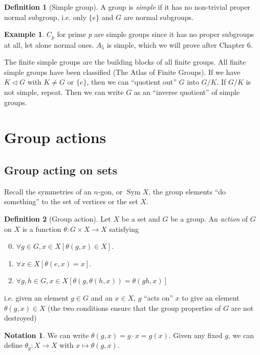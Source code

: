 \documentclass[a4paper]{article}
\theoremstyle{definition}
\newtheorem*{defi}{Definition}
\newtheorem*{eg}{Example}
\newtheorem*{notation}{Notation}
\let\stdsection\section
\renewcommand\section{\newpage\stdsection}
\DeclareMathOperator\Sym{Sym}
\begin{document}
\begin{defi}[Simple group]
  A group is \emph{simple} if it has no non-trivial proper normal subgroup, i.e. only $\{e\}$ and $G$ are normal subgroups.
\end{defi}

\begin{eg}
  $C_p$ for prime $p$ are simple groups since it has no proper subgroups at all, let alone normal ones.
  $A_5$ is simple, which we will prove after Chapter 6.
\end{eg}

The finite simple groups are the building blocks of all finite groups. All finite simple groups have been classified (The Atlas of Finite Groups). If we have $K\lhd G$ with $K\not= G$ or $\{e\}$, then we can ``quotient out'' $G$ into $G/K$. If $G/K$ is not simple, repeat. Then we can write $G$ as an ``inverse quotient'' of simple groups.

\section{Group actions}
\subsection{Group acting on sets}
Recall the symmetries of an $n$-gon, or $\Sym X$, the group elements ``do something'' to the set of vertices or the set $X$.

\begin{defi}[Group action]
  Let $X$ be a set and $G$ be a group. An \emph{action} of $G$ on $X$ is a function $\theta: G\times X\to X$ satisfying
  \begin{enumerate}[label=\arabic{*}.]
    \setcounter{enumi}{-1}
  \item $\forall g\in G, x\in X[\theta(g, x)\in X]$.
  \item $\forall x\in X[\theta(e, x) = x]$.
  \item $\forall g, h\in G, x\in X[\theta(g, \theta (h, x)) = \theta(gh, x)]$
  \end{enumerate}
  i.e. given an element $g\in G$ and an $x\in X$, $g$ ``acts on'' $x$ to give an element $\theta(g, x)\in X$ (the two conditions ensure that the group properties of $G$ are not destroyed)
\end{defi}

\begin{notation}
  We can write $\theta(g, x) = g\cdot x = g(x)$. Given any fixed $g$, we can define $\theta_g: X\to X$ with $x\mapsto \theta(g, x)$.
\end{notation}
\end{document}
